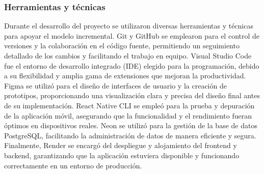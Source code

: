 \subsubsection{Herramientas y técnicas}

Durante el desarrollo del proyecto se utilizaron diversas herramientas y técnicas para apoyar el modelo incremental. Git y GitHub \cite{GitHub} se emplearon para el control de versiones y la colaboración en el código fuente, permitiendo un seguimiento detallado de los cambios y facilitando el trabajo en equipo. Visual Studio Code \cite{VSCode} fue el entorno de desarrollo integrado (IDE) elegido para la programación, debido a su flexibilidad y amplia gama de extensiones que mejoran la productividad. Figma \cite{Figma} se utilizó para el diseño de interfaces de usuario y la creación de prototipos, proporcionando una visualización clara y precisa del diseño final antes de su implementación. React Native CLI \cite{ReactNativeCLI} se empleó para la prueba y depuración de la aplicación móvil, asegurando que la funcionalidad y el rendimiento fueran óptimos en dispositivos reales. Neon \cite{Neon} se utilizó para la gestión de la base de datos PostgreSQL, facilitando la administración de datos de manera eficiente y segura. Finalmente, Render \cite{Render} se encargó del despliegue y alojamiento del frontend y backend, garantizando que la aplicación estuviera disponible y funcionando correctamente en un entorno de producción.